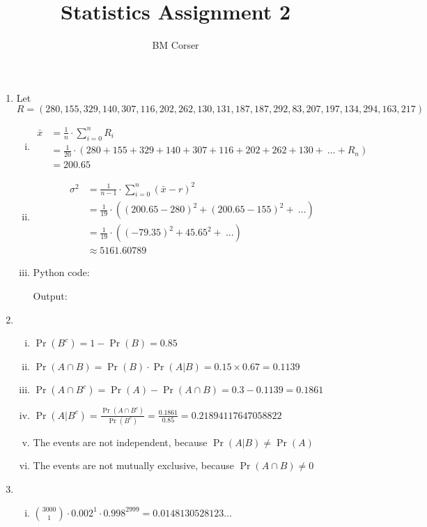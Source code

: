 \documentclass[10pt]{article}
\author{BM Corser}
\title{Statistics Assignment 2}
\begin{document}
    \maketitle 
    \begin{enumerate}
        \item Let $R = (280, 155, 329, 140, 307, 116, 202, 262, 130, 131, 187, 187, 292,
            83, 207, 197, 134, 294, 163, 217)$
            \begin{enumerate}[(i)]
            \item 
                \begin{align*}
                    \bar{x} &= \frac{1}{n}\cdot\sum_{i=0}^n R_i \\
                    &= \frac{1}{20}\cdot(280 + 155 + 329 + 140 + 307 + 116 + 202 + 262 + 130 + \ \dots + R_n) \\
                    &= 200.65
                \end{align*}
            \item 
                \begin{align*}
                    \sigma^2 &= \frac{1}{n - 1}\cdot\sum_{i=0}^n (\bar{x} - r)^2 \\
                    &= \frac{1}{19}\cdot((200.65 - 280)^2 + (200.65 - 155)^2 + \ \dots) \\
                    &= \frac{1}{19}\cdot((-79.35)^2 + 45.65^2 + \ \dots) \\
                    &\approx 5161.60789
                \end{align*}
            \item 
                Python code:
                
                Output:
                
            \end{enumerate}
        \item
            \begin{enumerate}[(i)]
                \item $\Pr(B^c) = 1 - \Pr(B) = 0.85$
                \item $\Pr(A \cap B) = \Pr(B) \cdot \Pr(A|B) = 0.15 \times 0.67 = 0.1139$
                \item $\Pr(A \cap B^c) = \Pr(A) - \Pr(A \cap B) = 0.3 - 0.1139 = 0.1861$
                \item $\Pr(A | B^c) = \frac{\Pr(A \cap B^c)}{\Pr(B^c)} = \frac{0.1861}{0.85} = 0.21894117647058822$
                \item The events are not independent, because $\Pr(A|B) \not= \Pr(A)$
                \item The events are not mutually exclusive, because $\Pr(A \cap B) \not= 0$
            \end{enumerate}
        \item 
            \begin{enumerate}[(i)]
                \item
                    $\binom{3000}{1} \cdot 0.002^1 \cdot 0.998^{2999} = 0.0148130528123 \dots$
                    \\


\end{enumerate}
\end{enumerate}
\end{document}
